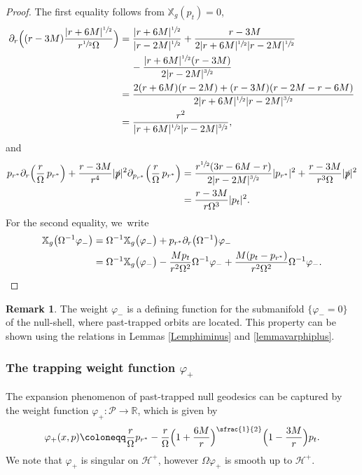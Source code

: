 \documentclass[10pt]{amsart}
\theoremstyle{plain}
\theoremstyle{definition}
\newtheorem{remark}[proposition]{Remark}
\newcommand\R{{\mathbb{R}}}
\newcommand\T{{\mathbb{X}}}
\begin{document}
\begin{proof}
The first equality follows from $\T_g(p_t)=0$,
\begin{align}
\partial_r \Bigl((r-3M) \frac{|r+6M|^{\sfrac{1}{2}}}{r^{\sfrac{1}{2}}\Omega} \Bigr) &= \frac{|r+6M|^{\sfrac{1}{2}}}{|r-2M|^{\sfrac{1}{2}}}+\frac{r-3M}{2|r+6M|^{\sfrac{1}{2}} |r-2M|^{\sfrac{1}{2}}} \nonumber \\
& \quad \, -\frac{|r+6M|^{\sfrac{1}{2}}(r-3M)}{2|r-2M|^{\sfrac{3}{2}}} \nonumber \\
& = \frac{2(r+6M)(r-2M)+(r-3M)(r-2M-r-6M)}{2|r+6M|^{\sfrac{1}{2}} |r-2M|^{\sfrac{3}{2}}}\label{equaequation1} \\
&=\frac{r^2}{|r+6M|^{\sfrac{1}{2}} |r-2M|^{\sfrac{3}{2}}}, \notag
\end{align}
and
\begin{align*}
p_{r^*}\partial_r \Bigl(\frac{r }{\Omega}\,p_{r^*} \Bigr)+\frac{r-3M}{r^4} |\slashed{p}|^2 \partial_{p_{r^*}} \Bigl(\frac{r }{\Omega}\,p_{r^*} \Bigr) & = \frac{r^{\sfrac{1}{2}}(3r-6M-r)}{2|r-2M|^{\sfrac{3}{2}}}|p_{r^*}|^2 +\frac{r-3M}{r^3\Omega} |\slashed{p}|^2 \\
& =\frac{r-3M}{r\Omega^3} |p_t|^2.
\end{align*}
For the second equality, we~write
\begin{equation}\label{eq:kevatalenn1}
\begin{aligned}
\T_g \bigl(\Omega^{-1} \varphi_- \bigr) & = \Omega^{-1}\T_g \bigl(\varphi_- \bigr)+p_{r^*} \partial_r \bigl(\Omega^{-1} \bigr) \varphi_- \\
& = \Omega^{-1}\T_g \bigl(\varphi_- \bigr)-\frac{Mp_t}{r^2 \Omega^2} \Omega^{-1} \varphi_- +\frac{M(p_t-p_{r^*})}{r^2 \Omega^2} \Omega^{-1} \varphi_-.
\end{aligned}\qedhere
\end{equation}
\end{proof}

\begin{remark}
The weight $\varphi_-$ is a defining function for the submanifold $\{\varphi_-=0\}$ of the null-shell, where past-trapped orbits are located. This property can be shown using the relations in Lemmas \ref{Lemphiminus} and \ref{lemmavarphiplus}.
\end{remark}

\subsubsection{The trapping weight function $\varphi_+$}
The expansion phenomenon of past-trapped null geodesics can be captured by the weight function $\varphi_{+} \colon \mathcal{P}\to \R$, which is given by\vspace*{-3pt}
\begin{equation}\label{eq:defvarphiplus}
\varphi_+ (x,p)\coloneqq\frac{r }{\Omega} p_{r^*} -\frac{r}{\Omega}\Bigl(1+\frac{6M}{r}\Bigr)^{\sfrac{1}{2}}\Bigl(1-\frac{3M}{r}\Bigr)p_t.
\end{equation}
We note that $\varphi_+$ is singular on $\mathcal{H}^+$, however $\Omega \varphi_+$ is smooth up to $\mathcal{H}^+$.
\end{document}
